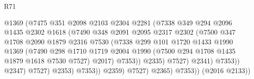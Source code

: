 \begin{lexlean}{R71}
\begin{coremodule}
                                    @1369
                                    (@7475
                                      @351
                                      @2098
                                      @2103
                                      @2304
                                      @2281
                                      (@7338
                                        @349
                                        @294
                                        @2096
                                        @1435
                                        @2302
                                        @1618
                                        (@7490
                                          @348
                                          @2091
                                          @2095
                                          @2317
                                          @2302
                                          (@7500
                                            @347
                                            @1708
                                            @2090
                                            @1879
                                            @2316
                                            @7530
                                            (@7338
                                              @299
                                              @101
                                              @1720
                                              @1433
                                              @1990
                                              @1369
                                              (@7490
                                                @298
                                                @1710
                                                @1719
                                                @2004
                                                @1990
                                                (@7500 @294 @1708 @1435 @1879 @1618 @7530 @7527)
                                                @2017)
                                              @7353))
                                          @2335)
                                        @7527)
                                      @2341)
                                    @7353))
                                @2347)
                              @7527)
                            @2353)
                          @7353))
                      @2359)
                    @7527)
                  @2365)
                @7353))
            (@2016 @2133))

\end{coremodule}
\end{lexlean}
